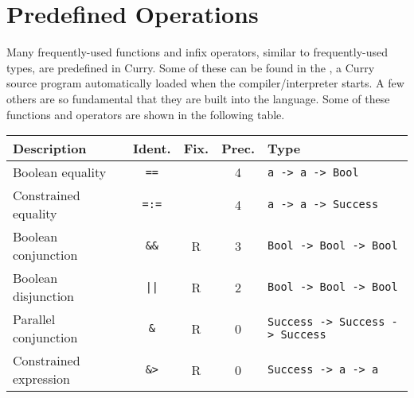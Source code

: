 \section{Predefined Operations}
\label{Predefined Operations}

Many frequently-used functions and infix operators,
similar to frequently-used types, are predefined in Curry.
Some of these can be found in the ,
a Curry source program automatically loaded when the
compiler/interpreter starts.
A few others are so fundamental that they are built into the language.
Some of these functions and operators are shown in the following table.
%
\begin{center}
\begin{tabular}{@{} || l | c | c | c | l || @{}}
\hline \hline
\bf Description & \bf Ident. & \bf Fix. & \bf Prec. & \bf Type \\
\hline \hline
Boolean equality & {\tt ==} & & 4 & {\tt a -> a -> Bool} \\
\hline
Constrained equality & {\tt =:=} & & 4 & {\tt a -> a -> Success} \\
\hline
Boolean conjunction & {\tt \&\&} & R & 3 & {\tt Bool -> Bool -> Bool} \\
\hline
Boolean disjunction & {\tt ||} & R & 2 & {\tt Bool -> Bool -> Bool} \\
\hline
Parallel conjunction & {\tt \&} & R & 0 & {\tt Success -> Success -> Success} \\
\hline
Constrained expression & {\tt \&>} & R & 0 & {\tt Success -> a -> a} \\
\hline
\hline
\end{tabular}
\end{center}
\pindex{==}\pindex{=:=}\pindex{\&\&}\pindex{\&}\pindex{\&>}

